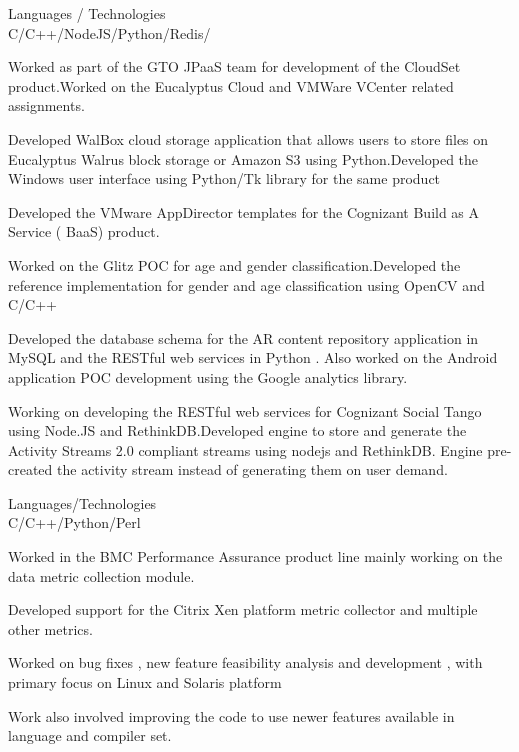 \documentclass[a4,11pt]{cv4tw}
\begin{document}
{Languages / Technologies \\ C/C++/NodeJS/Python/Redis/}
	{ 
	\begin{missions}
		\item Worked as part of the GTO JPaaS team for development of the CloudSet product.Worked on the Eucalyptus Cloud and VMWare VCenter related assignments.
		\item Developed WalBox cloud storage application that allows users to store files on Eucalyptus Walrus block storage or Amazon S3 using Python.Developed the Windows user interface using Python/Tk library for the same product
		\item Developed the VMware AppDirector templates for the Cognizant Build as A Service ( BaaS) product.
		\item Worked on the Glitz POC for age and gender classification.Developed the reference implementation for gender and age classification using OpenCV and C/C++
		\item Developed the database schema for the AR content repository application in MySQL and the RESTful web services in Python . Also worked on the Android application POC development using the Google analytics library.
		\item Working on  developing the RESTful web services for Cognizant Social Tango using Node.JS and RethinkDB.Developed engine to store and generate the Activity Streams 2.0 compliant streams using nodejs and RethinkDB. Engine pre-created the activity stream instead of generating them on user demand.
	\end{missions}
}

{Languages/Technologies \\ C/C++/Python/Perl}
	{ 
	\begin{missions}	
		\item Worked  in the BMC Performance Assurance product line mainly working on the data metric collection module.
		\item Developed support for the Citrix Xen platform metric collector and multiple other metrics.
		\item Worked  on bug fixes , new feature feasibility analysis and development , with primary focus on Linux and Solaris platform
		\item Work also involved improving the code to use newer features available in language and compiler set.
	\end{missions}
}
\end{document}
